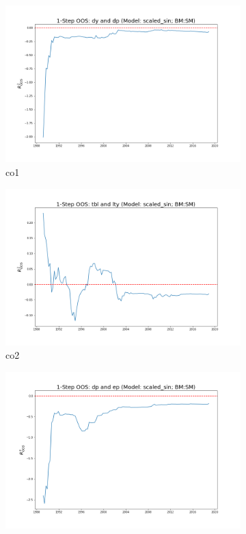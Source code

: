 \documentclass[a4paper,12pt,times,numbered,print,index]{report}
\numberwithin{equation}{section}
\begin{document}
\begin{figure}[!htbp]
	\centering
	\caption{OOS Results for Model with $f_3$}
	\begin{subfigure}[b]{0.42\linewidth}
		\includegraphics[width=0.9\linewidth]{OOS_plots/scaled_sin_co1_SM.png}
		\caption{co1}
	\end{subfigure}
	\begin{subfigure}[b]{0.42\linewidth}
		\includegraphics[width=0.9\linewidth]{OOS_plots/scaled_sin_co2_SM.png}
		\caption{co2}
	\end{subfigure}
	\begin{subfigure}[b]{0.42\linewidth}
		\includegraphics[width=0.9\linewidth]{OOS_plots/scaled_sin_co3_SM.png}

\end{subfigure}
\end{figure}
\end{document}
